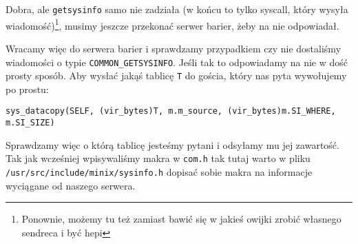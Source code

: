 Dobra, ale \texttt{getsysinfo} samo nie zadziała (w końcu to tylko syscall, który wysyła wiadomość)\footnote{Ponownie, możemy tu też zamiast bawić się w jakieś owijki zrobić własnego sendreca i być hepi}, musimy jeszcze przekonać serwer barier, żeby na nie odpowiadał.

Wracamy więc do serwera barier i sprawdzamy przypadkiem czy nie dostaliśmy wiadomości o typie \texttt{COMMON\_GETSYSINFO}.
Jeśli tak to odpowiadamy na nie w dość prosty sposób.
Aby wysłać jakąś tablicę \texttt{T} do gościa, który nas pyta wywołujemy po prostu:

\texttt{sys\_datacopy(SELF, (vir\_bytes)T, m.m\_source, (vir\_bytes)m.SI\_WHERE, m.SI\_SIZE)}

Sprawdzamy więc o którą tablicę jesteśmy pytani i odsyłamy mu jej zawartość.
Tak jak wcześniej wpisywaliśmy makra w \texttt{com.h} tak tutaj warto w pliku\\
\texttt{/usr/src/include/minix/sysinfo.h} dopisać sobie makra na informacje wyciągane od naszego serwera.
